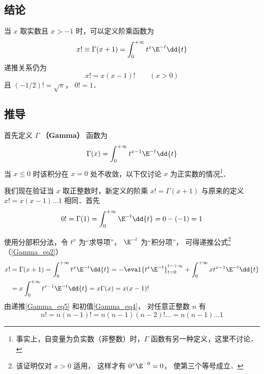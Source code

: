 

\subsection{结论}
当 $x$ 取实数且 $x>-1$ 时，可以定义阶乘函数为
\begin{equation}
x! \equiv \Gamma (x + 1) = \int_0^{+\infty} t^x \E^{-t} \dd{t}
\end{equation}
递推关系仍为
\begin{equation}\label{Gamma_eq2}
x!=x(x-1)! \qquad (x>0)
\end{equation}
且 $(-1/2)!=\sqrt{\pi}$，  $0! = 1$．

\subsection{推导}

首先定义 $\Gamma$ \textbf{（Gamma）} 函数为
\begin{equation}
\Gamma(x) = \int_0^{+\infty} t^{x-1} \E^{-t} \dd{t}
\end{equation}
当 $x \leqslant 0$ 时该积分在 $x=0$ 处不收敛，以下仅讨论 $x$ 为正实数的情况\footnote{事实上，自变量为负实数（非整数）时，$\Gamma$ 函数有另一种定义，这里不讨论．}．

我们现在验证当 $x$ 取正整数时，新定义的阶乘 $x! = \Gamma(x+1)$ 与原来的定义 $x! = x(x-1)\dots 1$ 相同．首先
\begin{equation}\label{Gamma_eq4}
0! = \Gamma(1) = \int_0^{+\infty} \E^{-t} \dd{t} = 0 - (-1) = 1
\end{equation}

使用分部积分法，令 $t^x$ 为“求导项”， $\E^{-t}$ 为“积分项”， 可得递推公式\footnote{该证明仅对 $x>0$ 适用， 这样才有 $0^x \E^{-0} = 0$， 使第三个等号成立．}（\autoref{Gamma_eq2}）
\begin{equation}\label{Gamma_eq5}
\begin{aligned}
x! &= \Gamma(x+1) = \int_0^{+\infty} t^x \E^{-t} \dd{t} =  - \eval{t^x \E^{-t}}_{t=0}^{t=+\infty} + \int_0^{+\infty} x t^{x-1} \E^{-t} \dd{t} \\
&= x\int_0^{+\infty} t^{x-1} \E^{-t} \dd{t} = x\Gamma (x) = x(x-1)!
\end{aligned} \end{equation} 
由递推\autoref{Gamma_eq5} 和初值\autoref{Gamma_eq4}， 对任意正整数 $n$ 有
\begin{equation}
n! = n(n-1)! = n(n-1)(n-2)!... = n(n-1)...1
\end{equation}

